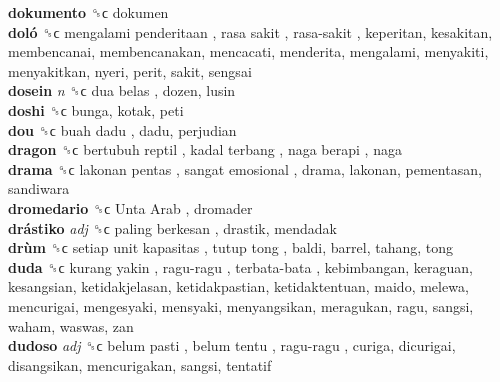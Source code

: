 \textbf{dokumento} ␝ϲ  dokumen  \\
\textbf{doló} ␝ϲ   mengalami penderitaan ,  rasa sakit ,  rasa-sakit , keperitan, kesakitan, membencanai, membencanakan, mencacati, menderita, mengalami, menyakiti, menyakitkan, nyeri, perit, sakit, sengsai  \\
\textbf{dosein} \emph{n}  ␝ϲ   dua belas , dozen, lusin  \\
\textbf{doshi} ␝ϲ  bunga, kotak, peti  \\
\textbf{dou} ␝ϲ   buah dadu , dadu, perjudian  \\
\textbf{dragon} ␝ϲ   bertubuh reptil ,  kadal terbang ,  naga berapi , naga  \\
\textbf{drama} ␝ϲ   lakonan pentas ,  sangat emosional , drama, lakonan, pementasan, sandiwara  \\
\textbf{dromedario} ␝ϲ   Unta Arab , dromader  \\
\textbf{drástiko} \emph{adj}  ␝ϲ   paling berkesan , drastik, mendadak  \\
\textbf{drùm} ␝ϲ   setiap unit kapasitas ,  tutup tong , baldi, barrel, tahang, tong  \\
\textbf{duda} ␝ϲ   kurang yakin ,  ragu-ragu ,  terbata-bata , kebimbangan, keraguan, kesangsian, ketidakjelasan, ketidakpastian, ketidaktentuan, maido, melewa, mencurigai, mengesyaki, mensyaki, menyangsikan, meragukan, ragu, sangsi, waham, waswas, zan  \\
\textbf{dudoso} \emph{adj}  ␝ϲ   belum pasti ,  belum tentu ,  ragu-ragu , curiga, dicurigai, disangsikan, mencurigakan, sangsi, tentatif  \\
